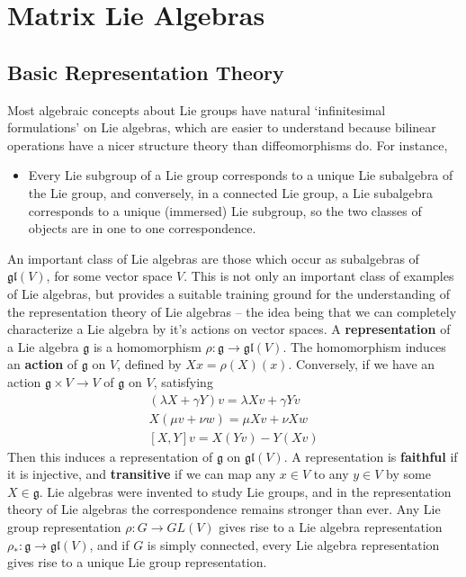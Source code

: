 \chapter{Matrix Lie Algebras}

\section{Basic Representation Theory}

Most algebraic concepts about Lie groups have natural `infinitesimal formulations' on Lie algebras, which are easier to understand because bilinear operations have a nicer structure theory than diffeomorphisms do. For instance,
%
\begin{itemize}
    \item Every Lie subgroup of a Lie group corresponds to a unique Lie subalgebra of the Lie group, and conversely, in a connected Lie group, a Lie subalgebra corresponds to a unique (immersed) Lie subgroup, so the two classes of objects are in one to one correspondence.
\end{itemize}
%
An important class of Lie algebras are those which occur as subalgebras of $\mathfrak{gl}(V)$, for some vector space $V$. This is not only an important class of examples of Lie algebras, but provides a suitable training ground for the understanding of the representation theory of Lie algebras -- the idea being that we can completely characterize a Lie algebra by it's actions on vector spaces. A {\bf representation} of a Lie algebra $\mathfrak{g}$ is a homomorphism $\rho: \mathfrak{g} \to \mathfrak{gl}(V)$. The homomorphism induces an {\bf action} of $\mathfrak{g}$ on $V$, defined by $Xx = \rho(X)(x)$. Conversely, if we have an action $\mathfrak{g} \times V \to V$ of $\mathfrak{g}$ on $V$, satisfying
%
\begin{align*}
    (\lambda X + \gamma Y)v = \lambda Xv + \gamma Yv\\
    X(\mu v + \nu w) = \mu Xv + \nu Xw\\
    [X,Y] v = X(Yv) - Y(Xv)
\end{align*}
%
Then this induces a representation of $\mathfrak{g}$ on $\mathfrak{gl}(V)$. A representation is {\bf faithful} if it is injective, and {\bf transitive} if we can map any $x \in V$ to any $y \in V$ by some $X \in \mathfrak{g}$. Lie algebras were invented to study Lie groups, and in the representation theory of Lie algebras the correspondence remains stronger than ever. Any Lie group representation $\rho: G \to GL(V)$ gives rise to a Lie algebra representation $\rho_*: \mathfrak{g} \to \mathfrak{gl}(V)$, and if $G$ is simply connected, every Lie algebra representation gives rise to a unique Lie group representation.

